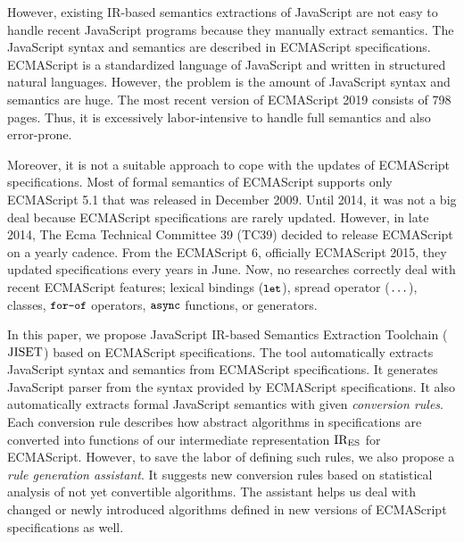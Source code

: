 However, existing IR-based semantics extractions of JavaScript are not easy to
handle recent JavaScript programs because they manually extract semantics.
The JavaScript syntax and semantics are described in ECMAScript specifications.
ECMAScript is a standardized language of JavaScript and written in structured natural languages.
However, the problem is the amount of JavaScript syntax and semantics are huge.
The most recent version of ECMAScript 2019 consists of 798 pages.
Thus, it is excessively labor-intensive to handle full semantics and also error-prone.

Moreover, it is not a suitable approach to cope with the updates of ECMAScript specifications.
Most of formal semantics of ECMAScript supports only ECMAScript 5.1 that was
released in December 2009. Until 2014, it was not a big deal because ECMAScript
specifications are rarely updated. However, in late 2014, The Ecma Technical
Committee 39 (TC39) decided to release ECMAScript on a yearly cadence. From the
ECMAScript 6, officially ECMAScript 2015, they updated specifications every years
in June. Now, no researches correctly deal with recent ECMAScript features;
lexical bindings (\( \texttt{\small let} \)), spread operator (\( \texttt{\small...} \)),
classes, \( \texttt{\small for-of} \) operators, \( \texttt{\small async} \) functions, or generators.

In this paper, we propose JavaScript IR-based Semantics Extraction Toolchain (\( \text{JISET} \))
based on ECMAScript specifications. The tool automatically extracts JavaScript
syntax and semantics from ECMAScript specifications. It generates JavaScript parser
from the syntax provided by ECMAScript specifications. It also automatically extracts
formal JavaScript semantics with given \textit{conversion rules}. Each conversion
rule describes how abstract algorithms in specifications are converted into
functions of our intermediate representation \( \text{IR}_\text{ES} \) for ECMAScript.
However, to save the labor of defining such rules, we also propose a \textit{rule generation assistant}.
It suggests new conversion rules based on statistical analysis of not yet convertible algorithms.
The assistant helps us deal with changed or newly introduced algorithms defined in new versions of
ECMAScript specifications as well.


